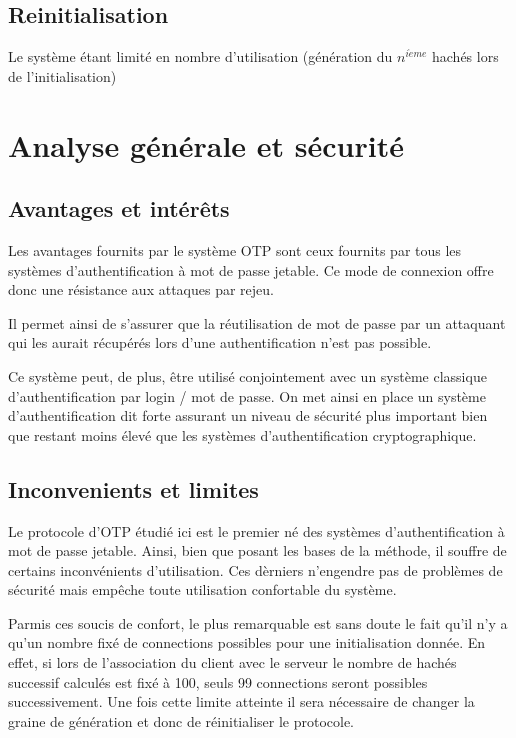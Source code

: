 \documentclass{../res/univ-projet}
\begin{document}
  \subsection{Reinitialisation}
    Le système étant limité en nombre d'utilisation (génération du $n^{i\grave{e}me}$ 
    hachés lors de l'initialisation)

\section{Analyse générale et sécurité}
    \subsection{Avantages et intér\^ets}
    Les avantages fournits par le système OTP sont ceux fournits par tous les
    systèmes d'authentification à mot de passe jetable. Ce mode de connexion 
    offre donc une résistance aux attaques par rejeu.
    
    Il permet ainsi de s'assurer que la réutilisation de mot de passe par un
    attaquant qui les aurait récupérés lors d'une authentification n'est pas 
    possible.
    
    Ce système peut, de plus, être utilisé conjointement avec un système 
    classique d'authentification par login / mot de passe. On met ainsi en 
    place un système d'authentification dit forte assurant un niveau de 
    sécurité plus important bien que restant moins élevé que les systèmes
    d'authentification cryptographique.
  
  \subsection{Inconvenients et limites}
  Le protocole d'OTP étudié ici est le premier né des systèmes 
  d'authentification à mot de passe jetable. Ainsi, bien que posant les bases
  de la méthode, il souffre de certains inconvénients d'utilisation. Ces 
  dèrniers n'engendre pas de problèmes de sécurité mais empêche toute 
  utilisation confortable du système.
  
  Parmis ces soucis de confort, le plus remarquable est sans doute le fait
  qu'il n'y a qu'un nombre fixé de connections possibles pour une 
  initialisation donnée. En effet, si lors de l'association du client avec 
  le serveur le nombre de hachés successif calculés est fixé à 100, seuls 
  99 connections seront possibles successivement. Une fois cette limite 
  atteinte il sera nécessaire de changer la graine de génération et donc
  de réinitialiser le protocole.
  
\end{document}
